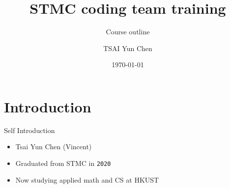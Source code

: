 \documentclass[10pt,xcolor={table,dvipsnames},t]{beamer}
\title[Your Short Title]{STMC coding team training}
\subtitle{Course outline}
\author{TSAI Yun Chen}
\date{\today}
\begin{document}
\begin{frame}
  \titlepage
\end{frame}


\section{Introduction}

\begin{frame}{Self Introduction}

\begin{itemize}
  \item Tsai Yun Chen (Vincent)
  \item Graduated from STMC in \texttt{2020}
  \item Now studying applied math and CS at HKUST
\end{itemize}

\end{frame}
\end{document}
